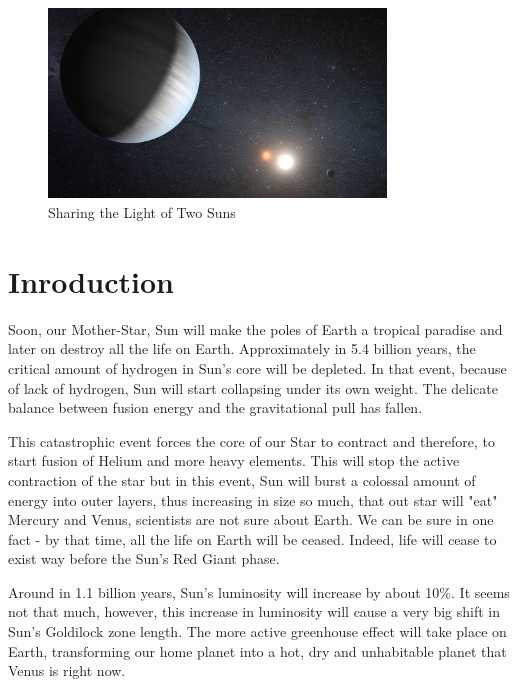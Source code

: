 \documentclass[a4paper,12pt]{article}
\begin{document}
  \begin{figure}[b!]
\begin{center}
    \includegraphics[width=0.8\textwidth]{kepler.jpg}
     \caption{Sharing the Light of Two Suns \cite{kepler}}
\end{center}
   
  \end{figure}



\newpage

\section{Inroduction}

Soon, our Mother-Star, Sun will make the poles of Earth a tropical paradise and later on destroy all the life on Earth. Approximately in 5.4 billion years, the critical amount of hydrogen in Sun's core will be depleted. In that event, because of lack of hydrogen, Sun will start collapsing under its own weight. The delicate balance between fusion energy and the gravitational pull has fallen.

This catastrophic event forces the core of our Star to contract and therefore, to start fusion of Helium and more heavy elements. This will stop the active contraction of the star but in this event, Sun will burst a colossal amount of energy into outer layers, thus increasing in size so much, that out star will "eat" Mercury and Venus, scientists are not sure about Earth. We can be sure in one fact -  by that time, all the life on Earth will be ceased. Indeed, life will cease to exist way before the Sun's Red Giant phase.

Around in 1.1 billion years, Sun's luminosity will increase by about 10\%. It seems not that much, however, this increase in luminosity will cause a very big shift in Sun's Goldilock zone length. The more active greenhouse effect will take place on Earth, transforming our home planet into a hot, dry and unhabitable planet that Venus is right now.\cite{sun}
\end{document}
